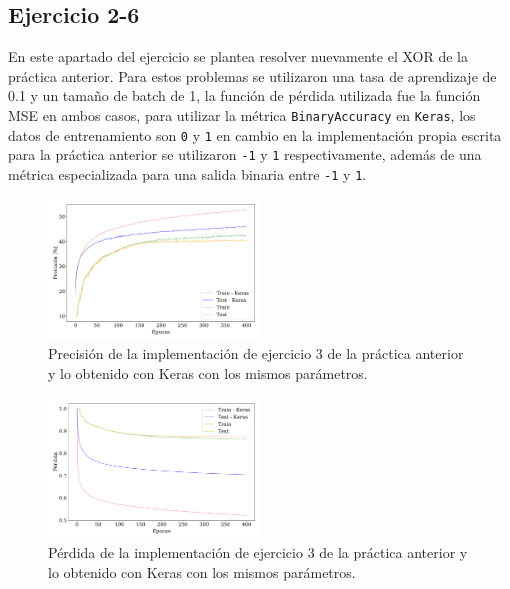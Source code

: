    \subsection*{Ejercicio 2-6}

    En este apartado del ejercicio se plantea resolver nuevamente el XOR de la práctica anterior. Para estos problemas se utilizaron una tasa de aprendizaje de 0.1 y un tamaño de batch de 1, la función de pérdida utilizada fue la función MSE en ambos casos, para utilizar la métrica \verb|BinaryAccuracy| en \verb|Keras|, los datos de entrenamiento son \verb|0| y \verb|1| en cambio en la implementación propia escrita para la práctica anterior se utilizaron   \verb|-1| y \verb|1| respectivamente, además de una métrica especializada para una salida binaria entre  \verb|-1| y \verb|1|.


    \begin{figure}[H]
        \begin{small}
            \begin{center}
                \includegraphics[width=0.5\textwidth]{Graphs/ejer2_3_acc.pdf}
            \end{center}
            \caption{Precisión de la implementación de ejercicio 3 de la práctica anterior y lo obtenido con Keras con los mismos parámetros.}
            \label{fig:ejer2_3_acc}
        \end{small}
    \end{figure}


    \begin{figure}[H]
        \begin{small}
            \begin{center}
                \includegraphics[width=0.5\textwidth]{Graphs/ejer2_3_loss.pdf}
            \end{center}
            \caption{Pérdida de la implementación de ejercicio 3 de la práctica anterior y lo obtenido con Keras con los mismos parámetros.}
            \label{fig:ejer2_3_loss}
        \end{small}
    \end{figure}

